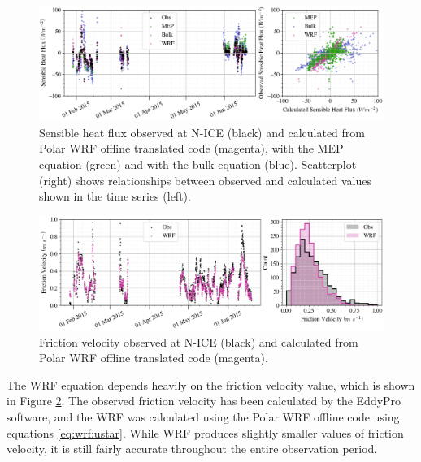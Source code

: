 {\begin{figure}[t!]
    \centering
    \includegraphics[width=1\linewidth]{figures/chapter6/sensible_wrf.png}
    \caption[Sensible heat flux observed at N-ICE and calculated from Polar WRF offline translated code.]{Sensible heat flux observed at N-ICE (black) and calculated from Polar WRF offline translated code (magenta), with the MEP equation (green) and with the bulk equation (blue). Scatterplot (right) shows relationships between observed and calculated values shown in the time series (left).}
    \label{fig:flux:sensible}
\end{figure}
\begin{figure}[b!]
    \centering
    \includegraphics[width=1\linewidth]{figures/chapter6/ustar_wrf.png}
    \caption[Friction velocity observed at N-ICE and calculated from Polar WRF offline translated code.]{Friction velocity observed at N-ICE (black) and calculated from Polar WRF offline translated code (magenta).}
    \label{fig:flux:ustar}
\end{figure}

The WRF equation depends heavily on the friction velocity value, which is shown in Figure \ref{fig:flux:ustar}. The observed friction velocity has been calculated by the EddyPro software, and the WRF was calculated using the Polar WRF offline code using equations \ref{eq:wrf:ustar}. While WRF produces slightly smaller values of friction velocity, it is still fairly accurate throughout the entire observation period. 

}
